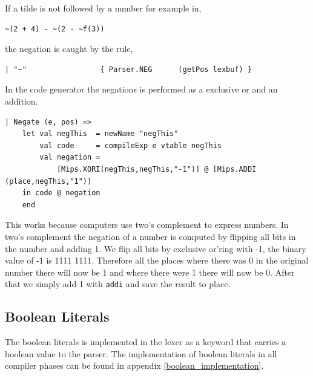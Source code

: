 \documentclass[11pt]{article}
\begin{document}
    If a tilde is not followed by a number for example in,

    \begin{lstlisting}
~(2 + 4) - ~(2 - ~f(3))
    \end{lstlisting}

    the negation is caught by the rule,

    \begin{lstlisting}
| "~"                 { Parser.NEG      (getPos lexbuf) }
    \end{lstlisting}

    In the code generator the negations is performed as a exclusive or and an
    addition.

    \begin{lstlisting}[basicstyle=\small]
| Negate (e, pos) =>
    let val negThis  = newName "negThis"
        val code     = compileExp e vtable negThis
        val negation =
            [Mips.XORI(negThis,negThis,"-1")] @ [Mips.ADDI (place,negThis,"1")]
    in code @ negation
    end
    \end{lstlisting}

    This works because computers use two's complement to express numbers.  In
    two's complement the negation of a number is computed by flipping all bits
    in the number and adding 1.  We flip all bits by exclusive or'ring with -1,
    the binary value of -1 is 1111 1111.  Therefore all the places where there
    was 0 in the original number there will now be 1 and where there were 1
    there will now be 0.  After that we simply add 1 with \texttt{addi} and save
    the result to place.

    \subsection{Boolean Literals}
    The boolean literals is implemented in the lexer as a keyword that carries a
    boolean value to the parser.  The implementation of boolean literals in all
    compiler phases can be found in appendix \ref{boolean_implementation}.
\end{document}
